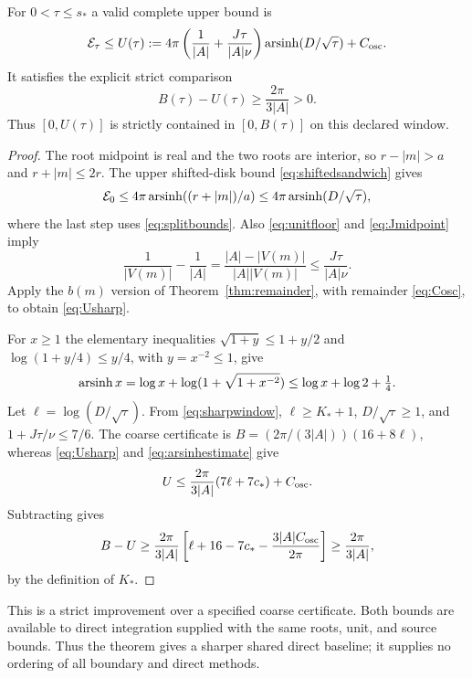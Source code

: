 \begin{theorem}
\label{thm:sharpheat}
For $0<\tau\leq s_*$ a valid complete upper bound is
\begin{equation}\label{eq:Usharp}
 \mathcal E_\tau\leq U(\tau):=
 4\pi\left(\frac1{|A|}+\frac{J\tau}{|A|\nu}\right)
               \operatorname{arsinh}(D/\sqrt\tau)+C_{\mathrm{osc}}.
\end{equation}
It satisfies the explicit strict comparison
\begin{equation}\label{eq:strictBU}
 B(\tau)-U(\tau)\geq\frac{2\pi}{3|A|}>0.
\end{equation}
Thus $[0,U(\tau)]$ is strictly contained in $[0,B(\tau)]$ on this
declared window.
\end{theorem}
\begin{proof}
The root midpoint is real and the two roots are interior, so
$r-|m|>a$ and $r+|m|\leq2r$. The upper shifted-disk bound
\eqref{eq:shiftedsandwich} gives
\[
 \mathcal E_0\leq4\pi\operatorname{arsinh}((r+|m|)/a)
       \leq4\pi\operatorname{arsinh}(D/\sqrt\tau),
\]
where the last step uses \eqref{eq:splitbounds}. Also
\eqref{eq:unitfloor} and \eqref{eq:Jmidpoint} imply
\[
 \frac1{|V(m)|}-\frac1{|A|}
 =\frac{|A|-|V(m)|}{|A||V(m)|}
 \leq\frac{J\tau}{|A|\nu}.
\]
Apply the $b(m)$ version of Theorem~\ref{thm:remainder}, with
remainder \eqref{eq:Cosc}, to obtain \eqref{eq:Usharp}.

For $x\geq1$ the elementary inequalities
$\sqrt{1+y}\leq1+y/2$ and $\log(1+y/4)\leq y/4$,
with $y=x^{-2}\leq1$, give
\begin{equation}\label{eq:arsinhestimate}
 \operatorname{arsinh} x=\log x+\log(1+\sqrt{1+x^{-2}})
                          \leq\log x+\log2+\tfrac14.
\end{equation}
Let $\ell=\log(D/\sqrt\tau)$. From \eqref{eq:sharpwindow},
$\ell\geq K_*+1$, $D/\sqrt\tau\geq1$, and
$1+J\tau/\nu\leq7/6$. The coarse certificate is
$B=(2\pi/(3|A|))(16+8\ell)$, whereas
\eqref{eq:Usharp} and \eqref{eq:arsinhestimate} give
\[
 U\leq\frac{2\pi}{3|A|}(7\ell+7c_*)+C_{\mathrm{osc}}.
\]
Subtracting gives
\[
 B-U\geq\frac{2\pi}{3|A|}
       \left[\ell+16-7c_*-\frac{3|A|C_{\mathrm{osc}}}{2\pi}\right]
       \geq\frac{2\pi}{3|A|},
\]
by the definition of $K_*$.
\end{proof}

This is a strict improvement over a specified coarse certificate. Both
bounds are available to direct integration supplied with the same roots,
unit, and source bounds. Thus the theorem gives a sharper shared direct
baseline; it supplies no ordering of all boundary and direct methods.

